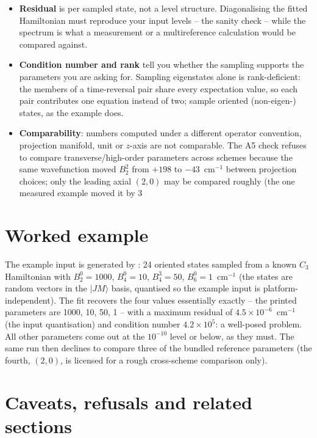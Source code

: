 \begin{readbox}
\begin{itemize}
  \item \textbf{Residual} is per sampled state, not a level structure.
    Diagonalising the fitted Hamiltonian must reproduce your input levels --
    the sanity check -- while the spectrum is what a measurement or a
    multireference calculation would be compared against.
  \item \textbf{Condition number and rank} tell you whether the sampling
    supports the parameters you are asking for. Sampling eigenstates alone is
    rank-deficient: the members of a time-reversal pair share every
    expectation value, so each pair contributes one equation instead of two;
    sample oriented (non-eigen-) states, as the example does.
  \item \textbf{Comparability}: numbers computed under a different operator
    convention, projection manifold, unit or $z$-axis are not comparable. The
    A5 check refuses to compare transverse/high-order parameters across
    schemes because the same wavefunction moved $B_2^2$ from $+198$ to
    $-43$~cm$^{-1}$ between projection choices; only the leading axial
    $(2,0)$ may be compared roughly (the one measured example moved it by 3%
\end{itemize}
\end{readbox}

\section{Worked example}

The example input is generated by
: 24 oriented states sampled from a known
$C_3$ Hamiltonian with $B_2^0 = 1000$, $B_4^0 = 10$, $B_4^3 = 50$,
$B_6^0 = 1$~cm$^{-1}$ (the states are random vectors in the $|J M\rangle$
basis, quantised so the example input is platform-independent). The fit
recovers the four values essentially exactly -- the printed parameters are
1000, 10, 50, 1 -- with a maximum residual of $4.5\times10^{-6}$~cm$^{-1}$
(the input quantisation) and condition number $4.2\times10^5$: a well-posed
problem. All other parameters come out at the $10^{-10}$ level or below, as
they must. The same run then declines to compare three of the bundled
reference parameters (the fourth, $(2,0)$, is licensed for a rough
cross-scheme comparison only).

\section{Caveats, refusals and related sections}

